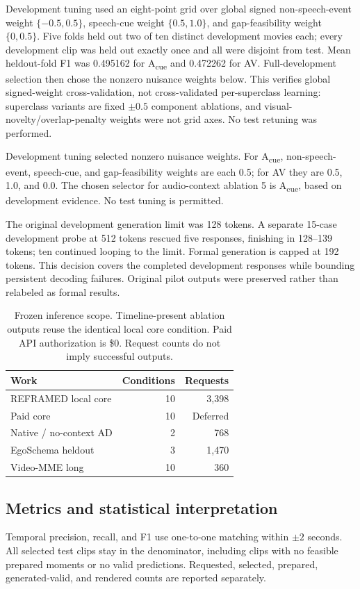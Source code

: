 \documentclass[10pt,twocolumn]{article}
\newcommand{\Acue}{A\textsubscript{cue}}
\begin{document}
Development tuning used an eight-point grid over global signed non-speech-event weight $\{-0.5,0.5\}$, speech-cue weight $\{0.5,1.0\}$, and gap-feasibility weight $\{0,0.5\}$. Five folds held out two of ten distinct development movies each; every development clip was held out exactly once and all were disjoint from test. Mean heldout-fold F1 was 0.495162 for \Acue{} and 0.472262 for AV. Full-development selection then chose the nonzero nuisance weights below. This verifies global signed-weight cross-validation, not cross-validated per-superclass learning: superclass variants are fixed $\pm0.5$ component ablations, and visual-novelty/overlap-penalty weights were not grid axes. No test retuning was performed.

Development tuning selected nonzero nuisance weights. For \Acue{}, non-speech-event, speech-cue, and gap-feasibility weights are each 0.5; for AV they are 0.5, 1.0, and 0.0. The chosen selector for audio-context ablation 5 is \Acue{}, based on development evidence. No test tuning is permitted.

The original development generation limit was 128 tokens. A separate 15-case development probe at 512 tokens rescued five responses, finishing in 128--139 tokens; ten continued looping to the limit. Formal generation is capped at 192 tokens. This decision covers the completed development responses while bounding persistent decoding failures. Original pilot outputs were preserved rather than relabeled as formal results.

\begin{table}[h]
\centering\small
\begin{tabular}{lrr}
\toprule Work & Conditions & Requests \\
\midrule REFRAMED local core & 10 & 3,398 \\
Paid core & 10 & Deferred \\
Native / no-context AD & 2 & 768 \\
EgoSchema heldout & 3 & 1,470 \\
Video-MME long & 10 & 360 \\
\bottomrule
\end{tabular}
\caption{Frozen inference scope. Timeline-present ablation outputs reuse the identical local core condition. Paid API authorization is \$0. Request counts do not imply successful outputs.}
\end{table}

\subsection{Metrics and statistical interpretation}
Temporal precision, recall, and F1 use one-to-one matching within $\pm2$ seconds. All selected test clips stay in the denominator, including clips with no feasible prepared moments or no valid predictions. Requested, selected, prepared, generated-valid, and rendered counts are reported separately.
\end{document}
